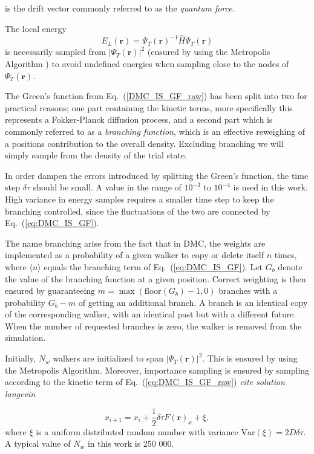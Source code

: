 \documentclass[amsmath, amssymb, aps, floatfix, nofootinbib, preprintnumbers,showpacs, superscriptaddress, twocolumn]{revtex4-1}
\begin{document}
\noindent
is the drift vector commonly referred to as the \textit{quantum force}.

The local energy
\begin{equation}
E_L(\mathbf{r}) = \Psi_T(\mathbf{r})^{-1}\hat{H} \Psi_T(\mathbf{r})
\end{equation}
is necessarily sampled from $|\Psi_T(\mathbf{r})|^2$ (ensured by using the Metropolis Algorithm \cite{abInitioMC}) to avoid undefined energies when sampling close to the nodes of $\Psi_T(\mathbf{r})$.

The Green's function from Eq.~(\ref{DMC_IS_GF_raw}) has been split into two for practical reasons; one part containing the kinetic terms, more specifically this represents a Fokker-Planck diffusion process, and a second part which is commonly referred to as a \textit{branching function}, which is an effective reweighing of a positions contribution to the overall density. Excluding branching we will simply sample from the density of the trial state.

In order dampen the errors introduced by splitting the Green's function, the time step $\delta\tau$ should be small. A value in the range of $10^{-3}$ to $10^{-4}$ is used in this work. High variance in energy samples requires a smaller time step to keep the branching controlled, since the fluctuations of the two are connected by Eq.~(\ref{eq:DMC_IS_GF}).

The name branching arise from the fact that in DMC, the weights are implemented as a probability of a given walker to copy or delete itself $n$ times, where $\langle n \rangle$ equals the branching term of Eq.~(\ref{eq:DMC_IS_GF}). Let $G_b$ denote the value of the branching function at a given position. Correct weighting is then ensured by guaranteeing $m = \max\left(\mathrm{floor}\left(G_b\right)-1, 0\right)$ branches with a probability $G_b - m$ of getting an additional branch. A branch is an identical copy of the corresponding walker, with an identical past but with a different future. When the number of requested branches is zero, the walker is removed from the simulation.


Initially, $N_w$ walkers are initialized to span $|\Psi_T(\mathbf{r})|^2$. This is ensured by using the Metropolis Algorithm. Moreover, importance sampling is ensured by sampling according to the kinetic term of  Eq.~(\ref{eq:DMC_IS_GF_raw}) \textit{cite solution langevin}

\begin{equation}
x_{i+1} = x_i + \frac{1}{2}\delta\tau F(\mathbf{r})_x + \xi,
\end{equation}
\noindent
where $\xi$ is a uniform distributed random number with variance $\mathrm{Var}(\xi) = 2D\delta\tau$. A typical value of $N_w$ in this work is 250 000.
\end{document}
